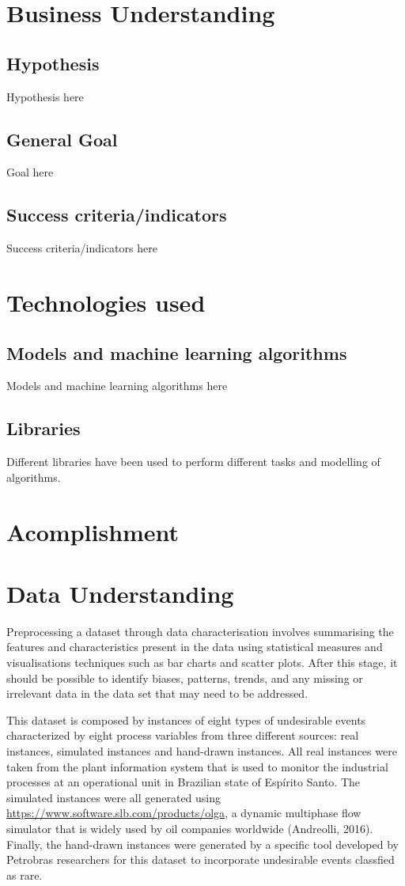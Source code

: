 \documentclass{article}
\begin{document}
\section{Business Understanding}

\subsection{Hypothesis}
Hypothesis here
\subsection{General Goal}
Goal here
\subsection{Success criteria/indicators}
Success criteria/indicators here

\section{Technologies used}
\subsection{Models and machine learning algorithms}
Models and machine learning algorithms here

\subsection{Libraries}
Different libraries have been used to perform different tasks and modelling of algorithms.

\section{Acomplishment}

\section{Data Understanding}

Preprocessing a dataset through data characterisation involves summarising the features and characteristics present in the data using statistical measures and visualisations techniques such as bar charts and scatter plots. After this stage, it should be possible to identify biases, patterns, trends, and any missing or irrelevant data in the data set that may need to be addressed.

This dataset is composed by instances of eight types of undesirable events characterized by eight process variables from three different sources: real instances, simulated instances and hand-drawn instances. All real instances were taken from the plant information system that is used to monitor the industrial processes at an operational unit in Brazilian state of Espírito Santo. The simulated instances were all generated using \href{OLGA}{https://www.software.slb.com/products/olga}, a dynamic multiphase flow simulator that is widely used by oil companies worldwide (Andreolli, 2016). Finally, the hand-drawn instances were generated by a specific tool developed by Petrobras researchers for this dataset to incorporate undesirable events classfied as rare.
\end{document}
